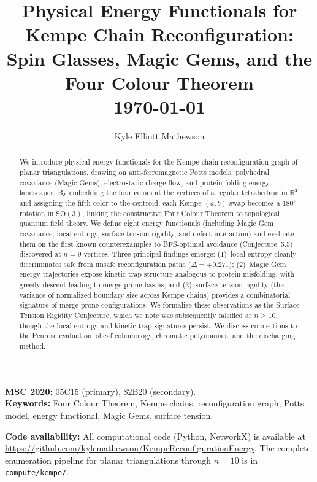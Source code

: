 
\title{\textbf{Physical Energy Functionals for Kempe Chain Reconfiguration:\\
Spin Glasses, Magic Gems, and the Four Colour Theorem}\\[1em]
\large \today}

\author{Kyle Elliott Mathewson}

\date{}

\maketitle

\begin{abstract}
We introduce physical energy functionals for the Kempe chain
reconfiguration graph of planar triangulations, drawing on
anti-ferromagnetic Potts models, polyhedral covariance (Magic Gems),
electrostatic charge flow, and protein folding energy landscapes. By
embedding the four colors at the vertices of a regular tetrahedron in
$\mathbb{R}^3$ and assigning the fifth color to the centroid, each Kempe
$(a,b)$-swap becomes a $180^\circ$ rotation in $\mathrm{SO}(3)$,
linking the constructive Four Colour Theorem to topological quantum
field theory. We define eight energy functionals (including Magic Gem
covariance, local entropy, surface tension rigidity, and defect
interaction) and evaluate them on the first known counterexamples to
BFS-optimal avoidance (Conjecture~5.5) discovered at $n = 9$ vertices.
Three principal findings emerge: (1)~local entropy cleanly discriminates
safe from unsafe reconfiguration paths ($\Delta = +0.271$); (2)~Magic
Gem energy trajectories expose kinetic trap structure analogous to
protein misfolding, with greedy descent leading to merge-prone basins;
and (3)~surface tension rigidity (the variance of normalized boundary
size across Kempe chains) provides a combinatorial signature of
merge-prone configurations. We formalize these observations as the
Surface Tension Rigidity Conjecture, which we note was subsequently
falsified at $n \geq 10$, though the local entropy and kinetic trap
signatures persist. We discuss connections to the Penrose evaluation,
sheaf cohomology, chromatic polynomials, and the discharging method.
\end{abstract}

\vspace{1em}
\noindent\textbf{MSC 2020:} 05C15 (primary), 82B20 (secondary).\\
\noindent\textbf{Keywords:} Four Colour Theorem, Kempe chains, reconfiguration graph, Potts model, energy functional, Magic Gems, surface tension.

\vspace{0.5em}
\noindent\textbf{Code availability:} All computational code (Python, NetworkX) is available at \url{https://github.com/kylemathewson/KempeReconfigurationEnergy}. The complete enumeration pipeline for planar triangulations through $n = 10$ is in \texttt{compute/kempe/}.

\thispagestyle{empty}
\newpage
